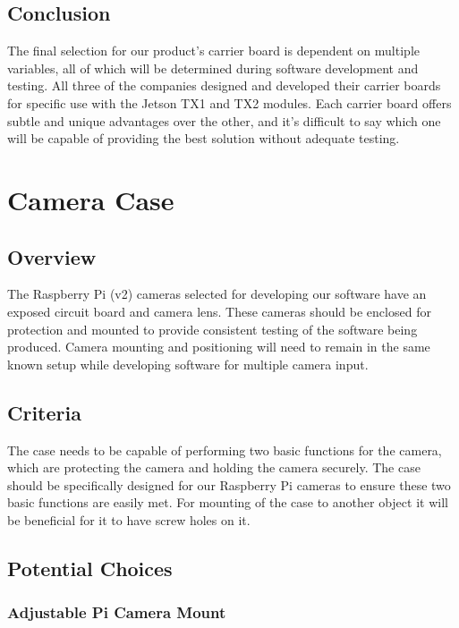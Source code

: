 \documentclass[letterpaper,10pt,serif,draftclsnofoot,onecolumn,compsoc,titlepage]{IEEEtran}
\begin{document}
\subsection{Conclusion}

The final selection for our product's carrier board is dependent on multiple variables, 
all of which will be determined during software development and testing. All three of 
the companies 
designed and developed their carrier boards for specific use with the Jetson TX1 and 
TX2 modules. Each carrier board offers subtle and unique 
advantages over the other, and it's difficult to say which one will be capable of 
providing the best solution without adequate testing. \\

\section{Camera Case}

\subsection{Overview}

The Raspberry Pi (v2) cameras selected for developing our software have an exposed circuit 
board and camera lens. These cameras should be enclosed for protection and mounted to 
provide consistent testing of the software being produced. Camera mounting and positioning
will need to remain in the same known setup while developing software for multiple camera 
input. \\

\subsection{Criteria}

The case needs to be capable of performing two basic functions for the camera, which 
are protecting the camera and holding the camera securely. The case should be specifically 
designed for our Raspberry Pi cameras to ensure these two basic functions are easily 
met. For mounting of the case to another object it will be beneficial for it to 
have screw holes on it. \\

\subsection{Potential Choices}

\subsubsection{Adjustable Pi Camera Mount}
\end{document}
